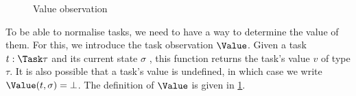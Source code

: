 \begin{figure}
  \caption{Value observation}
  \label{fig:observation-value}
\end{figure}

To be able to normalise tasks, we need to have a way to determine the value of them.
For this, we introduce the task observation $\Value$.
Given a task $t:\Task\tau$ and its current state $\sigma$ ,
this function returns the task's value $v$ of type $\tau$.
It is also possible that a task's value is undefined, in which case we write $\Value(t,\sigma) = \bot$.
The definition of $\Value$ is given in \cref{fig:observation-value}.